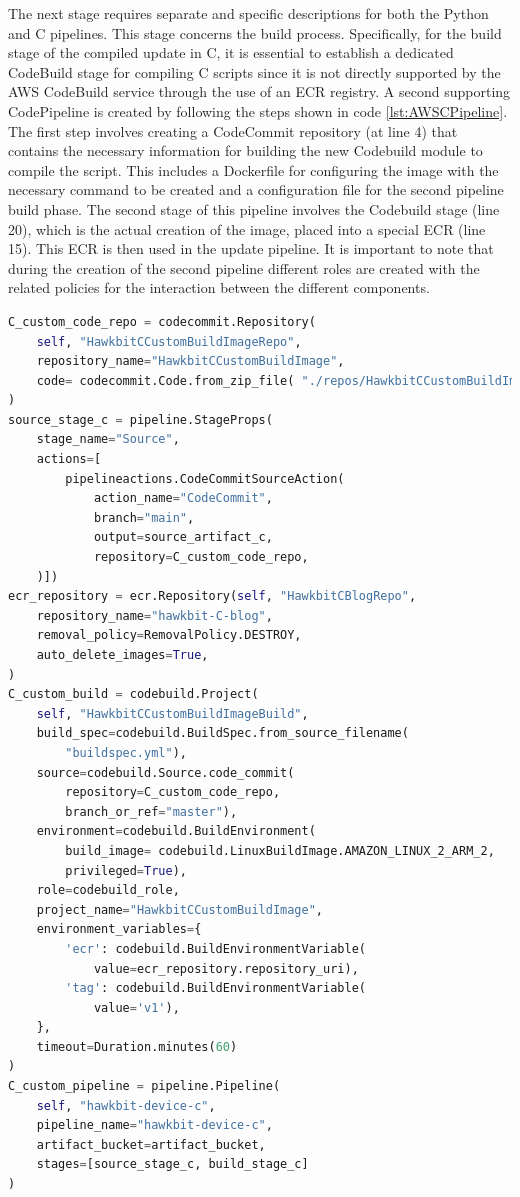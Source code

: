 The next stage requires separate and specific descriptions for both the Python and C pipelines. This stage concerns the build process. Specifically, for the build stage of the compiled update in C, it is essential to establish a dedicated CodeBuild stage for compiling C scripts since it is not directly supported by the AWS CodeBuild service through the use of an ECR registry. A second supporting CodePipeline is created by following the steps shown in code \ref{lst:AWSCPipeline}. The first step involves creating a CodeCommit repository (at line 4) that contains the necessary information for building the new Codebuild module to compile the script. This includes a Dockerfile for configuring the image with the necessary command to be created and a configuration file for the second pipeline build phase. The second stage of this pipeline involves the Codebuild stage (line 20), which is the actual creation of the image, placed into a special ECR (line 15). This ECR is then used in the update pipeline. It is important to note that during the creation of the second pipeline different roles are created with the related policies for the interaction between the different components.
\begin{lstlisting}[language=Python, caption={CDK Code for the Codepipeline for the C compiled file build creation}, label=lst:AWSCPipeline]
C_custom_code_repo = codecommit.Repository(
    self, "HawkbitCCustomBuildImageRepo",
    repository_name="HawkbitCCustomBuildImage",
    code= codecommit.Code.from_zip_file( "./repos/HawkbitCCustomBuildImage.zip", "main" )
)
source_stage_c = pipeline.StageProps(
    stage_name="Source",
    actions=[
        pipelineactions.CodeCommitSourceAction(
            action_name="CodeCommit",
            branch="main",
            output=source_artifact_c,
            repository=C_custom_code_repo,
    )])
ecr_repository = ecr.Repository(self, "HawkbitCBlogRepo",
    repository_name="hawkbit-C-blog",
    removal_policy=RemovalPolicy.DESTROY,
    auto_delete_images=True,
)
C_custom_build = codebuild.Project(
    self, "HawkbitCCustomBuildImageBuild",
    build_spec=codebuild.BuildSpec.from_source_filename(
        "buildspec.yml"),
    source=codebuild.Source.code_commit(
        repository=C_custom_code_repo,
        branch_or_ref="master"),
    environment=codebuild.BuildEnvironment(
        build_image= codebuild.LinuxBuildImage.AMAZON_LINUX_2_ARM_2,
        privileged=True),
    role=codebuild_role,
    project_name="HawkbitCCustomBuildImage",
    environment_variables={
        'ecr': codebuild.BuildEnvironmentVariable(
            value=ecr_repository.repository_uri),
        'tag': codebuild.BuildEnvironmentVariable(
            value='v1'),
    },
    timeout=Duration.minutes(60)
)
C_custom_pipeline = pipeline.Pipeline(
    self, "hawkbit-device-c",
    pipeline_name="hawkbit-device-c",
    artifact_bucket=artifact_bucket,
    stages=[source_stage_c, build_stage_c]
)
\end{lstlisting}

